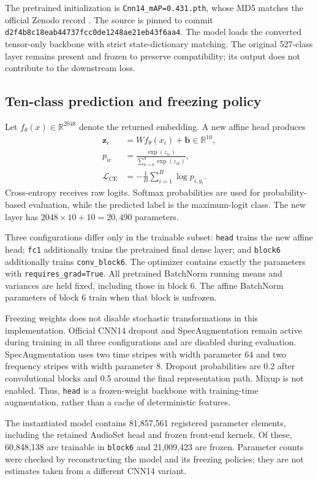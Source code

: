 \documentclass[conference]{IEEEtran}
\newcommand{\code}[1]{\texttt{#1}}
\begin{document}
The pretrained initialization is \code{Cnn14\_mAP=0.431.pth}, whose MD5 matches the official Zenodo record \cite{pannsweights}. The source is pinned to commit \nolinkurl{d2f4b8c18eab44737fcc0de1248ae21eb43f6aa4}. The model loads the converted tensor-only backbone with strict state-dictionary matching. The original 527-class layer remains present and frozen to preserve compatibility; its output does not contribute to the downstream loss.

\subsection{Ten-class prediction and freezing policy}
Let $f_\theta(x)\in\mathbb{R}^{2048}$ denote the returned embedding. A new affine head produces
\begin{align}
\mathbf{z}_i &= Wf_\theta(x_i)+\mathbf{b}\in\mathbb{R}^{10},\\
p_{ic} &= \frac{\exp(z_{ic})}{\sum_{k=0}^{9}\exp(z_{ik})},\\
\mathcal{L}_{\mathrm{CE}} &=-\frac{1}{B}\sum_{i=1}^{B}\log p_{i,y_i}.
\end{align}
Cross-entropy receives raw logits. Softmax probabilities are used for probability-based evaluation, while the predicted label is the maximum-logit class. The new layer has $2048\times10+10=20,490$ parameters.

Three configurations differ only in the trainable subset: \code{head} trains the new affine head; \code{fc1} additionally trains the pretrained final dense layer; and \code{block6} additionally trains \code{conv\_block6}. The optimizer contains exactly the parameters with \code{requires\_grad=True}. All pretrained BatchNorm running means and variances are held fixed, including those in block 6. The affine BatchNorm parameters of block 6 train when that block is unfrozen.

Freezing weights does not disable stochastic transformations in this implementation. Official CNN14 dropout and SpecAugmentation remain active during training in all three configurations and are disabled during evaluation. SpecAugmentation uses two time stripes with width parameter 64 and two frequency stripes with width parameter 8. Dropout probabilities are 0.2 after convolutional blocks and 0.5 around the final representation path. Mixup is not enabled. Thus, \code{head} is a frozen-weight backbone with training-time augmentation, rather than a cache of deterministic features.

The instantiated model contains 81,857,561 registered parameter elements, including the retained AudioSet head and frozen front-end kernels. Of these, 60,848,138 are trainable in \code{block6} and 21,009,423 are frozen. Parameter counts were checked by reconstructing the model and its freezing policies; they are not estimates taken from a different CNN14 variant.
\end{document}
